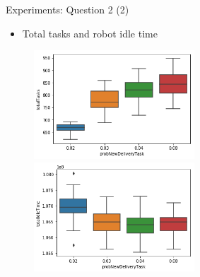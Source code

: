 \begin{frame}{Experiments: Question 2 (2)}
    \begin{itemize}
        \item Total tasks and robot idle time
    \end{itemize}

    \begin{figure}[!hbt]
        \begin{adjustbox}{center}
            \includegraphics[width=6cm]{imgs/question2-plot3}
            \includegraphics[width=6cm]{imgs/question2-plot1}
        \end{adjustbox}
    \end{figure}
\end{frame}

